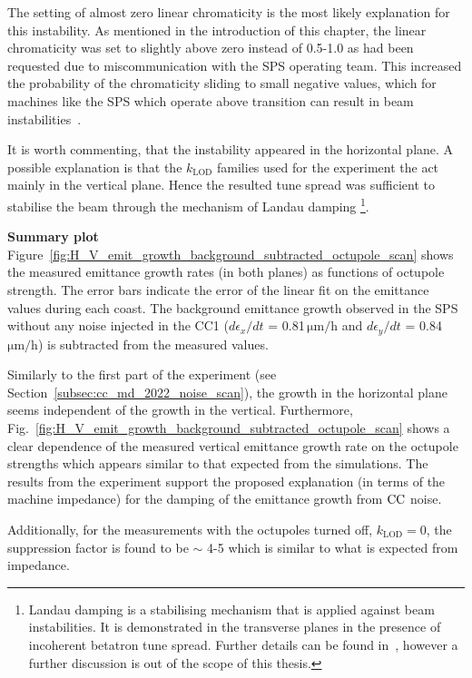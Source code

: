 The setting of almost zero linear chromaticity is the most likely explanation for this instability. As mentioned in the introduction of this chapter, the linear chromaticity was set to slightly above zero instead of 0.5-1.0 as had been requested due to miscommunication with the SPS operating team. This increased the probability of the chromaticity sliding to small negative values, which for machines like the SPS which operate above transition can result in beam instabilities~\cite{collective_effects_cas_li}.


It is worth commenting, that the instability appeared in the horizontal plane. A possible explanation is that the $k_\mathrm{LOD}$ families used for the experiment the act mainly in the vertical plane. Hence the resulted tune spread was sufficient to stabilise the beam through the mechanism of Landau damping \footnote{Landau damping is a stabilising mechanism that is applied against beam instabilities. It is demonstrated in the transverse planes in the presence of incoherent betatron tune spread. Further details can be found in~\cite{Herr:1982428, Schenk:2665819}, however a further discussion is out of the scope of this thesis.}.

\textbf{Summary plot}\\
Figure~\ref{fig:H_V_emit_growth_background_subtracted_octupole_scan} shows the measured emittance growth rates (in both planes) as functions of octupole strength. The error bars indicate the error of the linear fit on the emittance values during each coast. The background emittance growth observed in the SPS without any noise injected in the CC1 ($d\epsilon_x/dt$ = 0.81\,$\mathrm{\mu m/h}$ and $d\epsilon_y/dt$ = 0.84\,$\mathrm{\mu m/h}$) is subtracted from the measured values. 

Similarly to the first part of the experiment (see Section~\ref{subsec:cc_md_2022_noise_scan}), the growth in the horizontal plane seems independent of the growth in the vertical. Furthermore, Fig.~\ref{fig:H_V_emit_growth_background_subtracted_octupole_scan} shows a clear dependence of the measured vertical emittance growth rate on the octupole strengths which appears similar to that expected from the simulations. The results from the experiment support the proposed explanation (in terms of the machine impedance) for the damping of the emittance growth from ${\mathrm{CC}}$ noise.

Additionally, for the measurements with the octupoles turned off, $k_\mathrm{LOD}=0$, the suppression factor is found to be $\sim$ 4-5 which is similar to what is expected from impedance.

